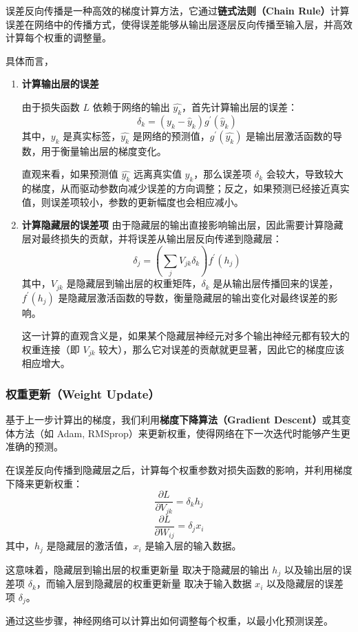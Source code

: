 误差反向传播是一种高效的梯度计算方法，它通过{\bf 链式法则（Chain Rule）}计算误差在网络中的传播方式，使得误差能够从输出层逐层反向传播至输入层，并高效计算每个权重的调整量。

具体而言，
\begin{enumerate}
\item {\bf  计算输出层的误差}

由于损失函数 $L$ 依赖于网络的输出 $\hat{y_k}$，首先计算输出层的误差：
$$
\delta_k = \left( y_k-\hat y_k \right)g^\prime(\hat y_k)
$$
其中，$y_k$ 是真实标签，$\hat{y_k}$ 是网络的预测值，$g^\prime(\hat{y_k})$ 是输出层激活函数的导数，用于衡量输出层的梯度变化。

直观来看，如果预测值 $\hat{y_k}$ 远离真实值 $y_k$，那么误差项 $\delta_k$ 会较大，导致较大的梯度，从而驱动参数向减少误差的方向调整；反之，如果预测已经接近真实值，则误差项较小，参数的更新幅度也会相应减小。

\item {\bf 计算隐藏层的误差项}
由于隐藏层的输出直接影响输出层，因此需要计算隐藏层对最终损失的贡献，并将误差从输出层反向传递到隐藏层：
$$
\delta_j = \left(\sum_j V_{jk} \delta_k  \right)f^\prime(h_j)
$$
其中，$V_{jk}$ 是隐藏层到输出层的权重矩阵，$\delta_k$ 是从输出层传播回来的误差，$f^\prime(h_j)$ 是隐藏层激活函数的导数，衡量隐藏层的输出变化对最终误差的影响。

这一计算的直观含义是，如果某个隐藏层神经元对多个输出神经元都有较大的权重连接（即 $V_{jk}$ 较大），那么它对误差的贡献就更显著，因此它的梯度应该相应增大。
\end{enumerate}

\subsubsection*{权重更新（Weight Update）}

基于上一步计算出的梯度，我们利用{\bf 梯度下降算法（Gradient Descent）}或其变体方法（如 Adam, RMSprop）来更新权重，使得网络在下一次迭代时能够产生更准确的预测。

{ 在误差反向传播到隐藏层之后，计算每个权重参数对损失函数的影响，并利用梯度下降来更新权重：
$$
 \frac{\partial L}{\partial V_{jk}}=\delta_k h_j 
$$
$$
 \frac{\partial L}{\partial W_{ij}}=\delta_j x_i 
$$
其中，$h_j$ 是隐藏层的激活值，$x_i$ 是输入层的输入数据。

这意味着，隐藏层到输出层的权重更新量 取决于隐藏层的输出 $h_j$ 以及输出层的误差项 $\delta_k$，而输入层到隐藏层的权重更新量 取决于输入数据 $x_i$ 以及隐藏层的误差项 $\delta_j$。

通过这些步骤，神经网络可以计算出如何调整每个权重，以最小化预测误差。}

